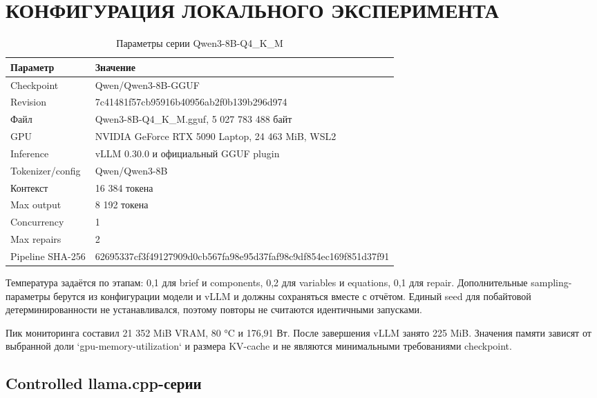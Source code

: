 \chapter{КОНФИГУРАЦИЯ ЛОКАЛЬНОГО ЭКСПЕРИМЕНТА}
\label{app:configuration}

\begin{table}[H]
    \centering
    \caption{Параметры серии Qwen3-8B-Q4\_K\_M}
    \label{tab:experiment-config}
    \small
    \begin{tabularx}{\textwidth}{L{5cm}X}
        \toprule
        Параметр & Значение \\
        \midrule
        Checkpoint & Qwen/Qwen3-8B-GGUF \\
        Revision & 7c41481f57cb95916b40956ab2f0b139b296d974 \\
        Файл & Qwen3-8B-Q4\_K\_M.gguf, 5 027 783 488 байт \\
        GPU & NVIDIA GeForce RTX 5090 Laptop, 24 463 MiB, WSL2 \\
        Inference & vLLM 0.30.0 и официальный GGUF plugin \\
        Tokenizer/config & Qwen/Qwen3-8B \\
        Контекст & 16 384 токена \\
        Max output & 8 192 токена \\
        Concurrency & 1 \\
        Max repairs & 2 \\
        Pipeline SHA-256 & {\scriptsize\ttfamily 62695337cf3f4912\allowbreak 7909d0cb567fa98e\allowbreak 95d37faf98c9df85\allowbreak 4ec169f851d37f91} \\
        \bottomrule
    \end{tabularx}
\end{table}

Температура задаётся по этапам: 0,1 для brief и components, 0,2 для variables и equations, 0,1 для repair. Дополнительные sampling-параметры берутся из конфигурации модели и vLLM и должны сохраняться вместе с отчётом. Единый seed для побайтовой детерминированности не устанавливался, поэтому повторы не считаются идентичными запусками.

Пик мониторинга составил 21 352 MiB VRAM, 80 °C и 176,91 Вт. После завершения vLLM занято 225 MiB. Значения памяти зависят от выбранной доли `gpu-memory-utilization` и размера KV-cache и не являются минимальными требованиями checkpoint.

\section{Controlled llama.cpp-серии}

